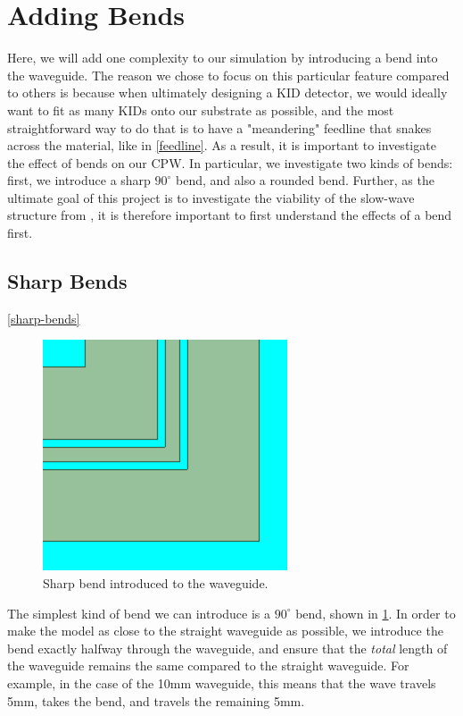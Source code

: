 \section{Adding Bends}
Here, we will add one complexity to our simulation by introducing a bend into the waveguide. The reason we
chose to focus on this particular feature compared to others is because when ultimately designing a KID
detector, we would ideally want to fit as many KIDs onto our substrate as possible, and the most
straightforward way to do
that is to have a "meandering" feedline that snakes across the material, like in \cref{feedline}. As a
result, it is important to investigate the effect of bends on our CPW. In particular, we investigate two
kinds of bends: first, we introduce a sharp \( 90^{\circ} \) bend, and also a rounded bend. Further, as the
ultimate goal of this project is to investigate the viability of the slow-wave structure from
\cite{hosaengkimWireBondFreeTechnique2009}, it is therefore important to first understand the effects of a
bend first. 

\subsection{Sharp Bends}
\cref{sharp-bends}

\begin{figure}
	\centering
	\includegraphics[scale=0.5]{images/model/sharp-bend.png}
	\caption{Sharp bend introduced to the waveguide.} 
	\label{sharp-bend}
\end{figure}

The simplest kind of bend we can introduce is a \( 90^{\circ} \) bend, shown in \cref{sharp-bend}. In order
to make the model as close to the straight waveguide as possible, we introduce the bend exactly halfway
through the waveguide, and ensure that the \textit{total} length of the waveguide remains the same compared
to the straight waveguide. For example, in the case of the 10mm waveguide, this means that the wave travels
5mm, takes the bend, and travels the remaining 5mm. 

